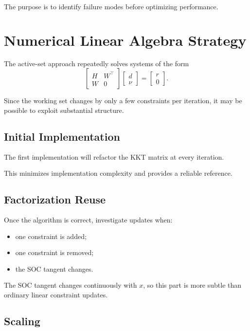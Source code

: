 \documentclass[11pt,a4paper]{article}
\begin{document}
The purpose is to identify failure modes before optimizing performance.

\section{Numerical Linear Algebra Strategy}

The active-set approach repeatedly solves systems of the form
\[
\begin{bmatrix}
H&W^\top\\
W&0
\end{bmatrix}
\begin{bmatrix}
d\\
\nu
\end{bmatrix}
=
\begin{bmatrix}
r\\
0
\end{bmatrix}.
\]

Since the working set changes by only a few constraints per iteration,
it may be possible to exploit substantial structure.

\subsection{Initial Implementation}

The first implementation will refactor the KKT matrix at every
iteration.

This minimizes implementation complexity and provides a reliable
reference.

\subsection{Factorization Reuse}

Once the algorithm is correct, investigate updates when:

\begin{itemize}
    \item one constraint is added;
    \item one constraint is removed;
    \item the SOC tangent changes.
\end{itemize}

The SOC tangent changes continuously with $x$, so this part is more
subtle than ordinary linear constraint updates.

\subsection{Scaling}
\end{document}
